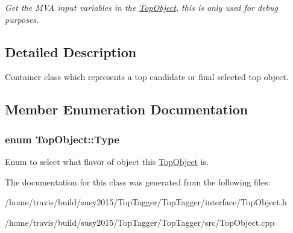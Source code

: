 \begin{DoxyCompactItemize}
\begin{DoxyCompactList}\small\item\em Get the M\-V\-A input variables in the \hyperlink{classTopObject}{Top\-Object}, this is only used for debug purposes. \end{DoxyCompactList}\end{DoxyCompactItemize}


\subsection{Detailed Description}
Container class which represents a top candidate or final selected top object. 

\subsection{Member Enumeration Documentation}
\hypertarget{classTopObject_af82a20e421c29bc667af7cd73fc46ba4}{
\subsubsection[{Type}]{\setlength{\rightskip}{0pt plus 5cm}enum {\bf Top\-Object\-::\-Type}}}\label{classTopObject_af82a20e421c29bc667af7cd73fc46ba4}
Enum to select what flavor of object this \hyperlink{classTopObject}{Top\-Object} is. 

The documentation for this class was generated from the following files\-:\begin{DoxyCompactItemize}
\item 
/home/travis/build/susy2015/\-Top\-Tagger/\-Top\-Tagger/interface/Top\-Object.\-h\item 
/home/travis/build/susy2015/\-Top\-Tagger/\-Top\-Tagger/src/Top\-Object.\-cpp\end{DoxyCompactItemize}
